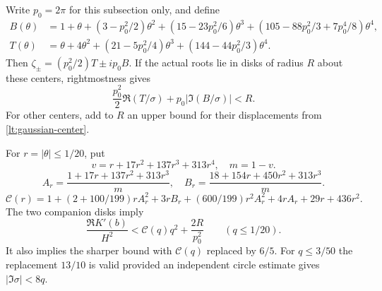 Write $p_0=2\pi$ for this subsection only, and define
\begin{align*}
 B(\theta)&=1+\theta+(3-p_0^2/2)\theta^2
 +(15-23p_0^2/6)\theta^3
 +(105-88p_0^2/3+7p_0^4/8)\theta^4,\\
 T(\theta)&=\theta+4\theta^2+(21-5p_0^2/4)\theta^3
 +(144-44p_0^2/3)\theta^4.
\end{align*}
Then $\zeta_\pm=(p_0^2/2)T\pm ip_0B$. If the actual roots lie
in disks of radius $R$ about these centers, rightmostness gives
\begin{equation}\label{lt:signed-projection}
 \frac{p_0^2}2\Re(T/\sigma)+p_0|\Im(B/\sigma)|<R.
\end{equation}
For other centers, add to $R$ an upper bound for their displacements
from \eqref{lt:gaussian-center}.

\begin{lemma}\label{lt:signed-moment}
For $r=|\theta|\le1/20$, put
\[
 v=r+17r^2+137r^3+313r^4,\quad m=1-v.
\]
\[
 A_r=\frac{1+17r+137r^2+313r^3}{m},\quad
 B_r=\frac{18+154r+450r^2+313r^3}{m}.
\]
\[
 \mathcal C(r)=1+(2+100/199)rA_r^2+3rB_r
        +(600/199)r^2A_r^2+4rA_r+29r+436r^2.
\]
The two companion disks imply
\begin{equation}\label{lt:curvature-Cq}
 \frac{\Re K'(b)}{H^2}<\mathcal C(q)q^2+\frac{2R}{p_0^2}
 \qquad(q\le1/20).
\end{equation}
It also implies the sharper bound with $\mathcal C(q)$ replaced by
$6/5$. For $q\le3/50$ the replacement $13/10$ is valid provided
an independent circle estimate gives
$|\Im\sigma|<8q$.
\end{lemma}
